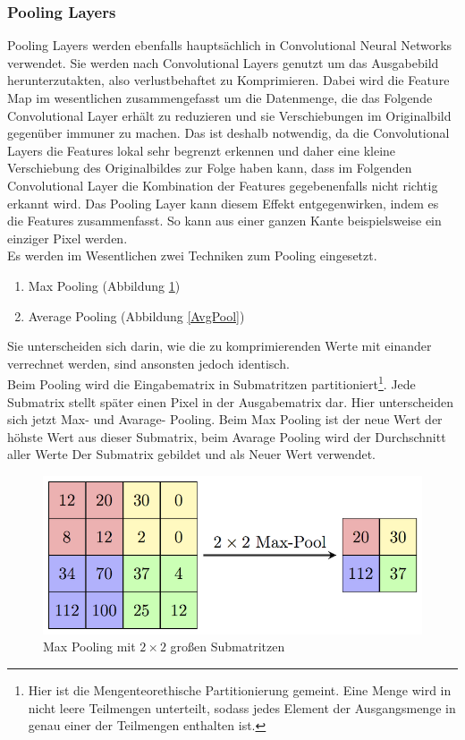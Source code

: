 \documentclass{article}
\begin{document}
\subsubsection{Pooling Layers}
Pooling Layers werden ebenfalls hauptsächlich in Convolutional Neural Networks verwendet. Sie werden nach Convolutional Layers genutzt um das Ausgabebild herunterzutakten, also verlustbehaftet zu Komprimieren. Dabei wird die Feature Map im wesentlichen zusammengefasst um die Datenmenge, die das Folgende Convolutional Layer erhält zu reduzieren und sie Verschiebungen im Originalbild gegenüber immuner zu machen. Das ist deshalb notwendig, da die Convolutional Layers die Features lokal sehr begrenzt erkennen und daher eine kleine Verschiebung des Originalbildes zur Folge haben kann, dass im Folgenden Convolutional Layer die Kombination der Features gegebenenfalls nicht richtig erkannt wird. Das Pooling Layer kann diesem Effekt entgegenwirken, indem es die Features zusammenfasst. So kann aus einer ganzen Kante beispielsweise ein einziger Pixel werden.\\
Es werden im Wesentlichen zwei Techniken zum Pooling eingesetzt. 
\begin{enumerate}
	\item Max Pooling (Abbildung \ref{Maxpool})
	\item Average Pooling (Abbildung \ref{AvgPool})
\end{enumerate}
Sie unterscheiden sich darin, wie die zu komprimierenden Werte mit einander verrechnet werden, sind ansonsten jedoch identisch.\\
Beim Pooling wird die Eingabematrix in Submatritzen partitioniert\footnote{Hier ist die Mengenteorethische Partitionierung gemeint. Eine Menge wird in nicht leere Teilmengen unterteilt, sodass jedes Element der Ausgangsmenge in genau einer der Teilmengen enthalten ist.}. Jede Submatrix stellt später einen Pixel in der Ausgabematrix dar. Hier unterscheiden sich jetzt Max- und Avarage- Pooling. Beim Max Pooling ist der neue Wert der höhste Wert aus dieser Submatrix, beim Avarage Pooling wird der Durchschnitt aller Werte Der Submatrix gebildet und als Neuer Wert verwendet.
\begin{figure}[h]
	\centering
	\includegraphics[width=0.7\linewidth]{../graphics/MaxpoolSample2.png}
	\caption[Max Pooling mit $2\times2$ großen Submatritzen\newline
	Quelle: https://computersciencewiki.org/index.php/Max-pooling\_/\_Pooling\\
	CC BY NC SA Lizenz]{Max Pooling mit $2\times2$ großen Submatritzen}
	\label{Maxpool}
\end{figure}
\end{document}
